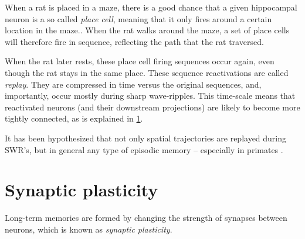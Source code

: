 
When a rat is placed in a maze, there is a good chance that a given hippocampal neuron is a so called \emph{place cell}, meaning that it only fires around a certain location in the maze.\footnotemark{}. When the rat walks around the maze, a set of place cells will therefore fire in sequence, reflecting the path that the rat traversed.


When the rat later rests, these place cell firing sequences occur again, even though the rat stays in the same place. These sequence reactivations are called \emph{replay}. They are compressed in time versus the original sequences, and, importantly, occur mostly during sharp wave-ripples. This time-scale means that reactivated neurons (and their downstream projections) are likely to become more tightly connected, as is explained in \cref{sec:synaptic-plasticity}.

It has been hypothesized that not only spatial trajectories are replayed during SWR's, but in general any type of episodic memory -- especially in primates \cite{Girardeau2011}.



\section{Synaptic plasticity}
\label{sec:synaptic-plasticity}

Long-term memories are formed by changing the strength of synapses between neurons, which is known as \emph{synaptic plasticity}.\footnotemark{}



